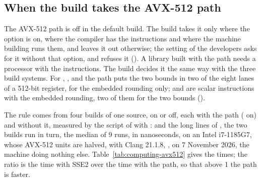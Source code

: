 \subsection{When the build takes the AVX-512 path}
\label{sec:computing-avx512-rule}
%

The AVX-512 path is off in the default build. The build takes it only where
the option  is on, where the compiler has the
instructions and where the machine building runs them, and leaves it out
otherwise; the setting of the developers 
asks for it without that option, and  refuses it
(). A library built with the path needs a processor with the
instructions. The
build decides it the same way with the three build
systems.\newinvfive{} For \code{+}, \code{-}, \code{*} and  the
path puts the two bounds in two of the eight lanes of a 512-bit register,
for the embedded rounding only; \code{/} and  are scalar
instructions with the embedded rounding, two of them for the two bounds
().

\medskip
The rule comes from four builds of one source, 
on or off, each with the path ( on) and without
it, measured by the script  of 
with :  and the long lines of
, the two builds run in turn, the median
of 9 runs, in nanoseconds, on an Intel i7-1185G7, whose AVX-512 units are
halved, with Clang 21.1.8, , on 7 November 2026, the
machine doing nothing else. Table~\ref{tab:computing-avx512} gives the
times; the ratio is the time with SSE2 over the time with the path, so that
above 1 the path is faster.


